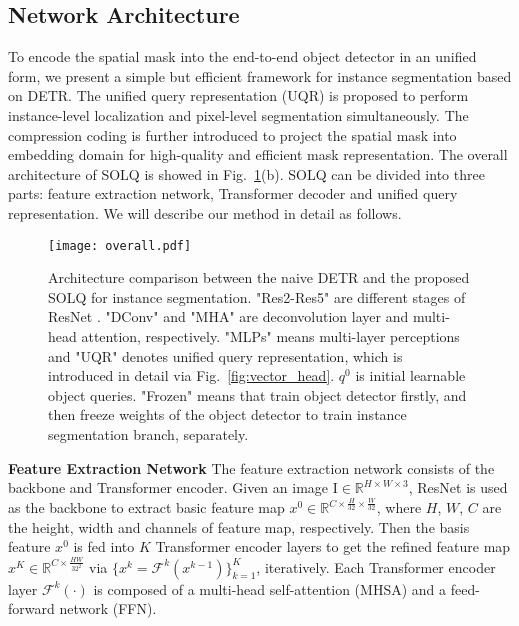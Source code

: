 \documentclass{article}
\begin{document}
\subsection{Network Architecture}
To encode the spatial mask into the end-to-end object detector in an unified form, we present a simple but efficient framework for instance segmentation based on DETR. The unified query representation (UQR) is proposed to perform instance-level localization and pixel-level segmentation simultaneously. The compression coding is further introduced to project the spatial mask into embedding domain for high-quality and efficient mask representation. 
The overall architecture of SOLQ is showed in Fig.~\ref{fig:architecture}(b). SOLQ can be divided into three parts: feature extraction network, Transformer decoder and unified query representation. We will describe our method in detail as follows.

\begin{figure}[h]
\centering
\texttt{[image: overall.pdf]}
\caption{Architecture comparison between the naive DETR and the proposed SOLQ for instance segmentation. "Res2-Res5" are different stages of ResNet \cite{he2016resnet}. "DConv" and "MHA" are deconvolution \cite{zeiler2010deconvolutional} layer and multi-head attention, respectively. "MLPs" means multi-layer perceptions and "UQR" denotes unified query representation, which is introduced in detail via Fig.~\ref{fig:vector_head}. $q^{0}$ is initial learnable object queries. "Frozen" means that train object detector firstly, and then freeze weights of the object detector to train instance segmentation branch, separately.}
\label{fig:architecture}
\end{figure}

\textbf{Feature Extraction Network}
The feature extraction network consists of the backbone and Transformer encoder. Given an image $\mathrm{I} \in\mathbb{R}^{H \times W \times 3}$, ResNet \cite{he2016resnet} is used as the backbone to extract basic feature map $x^{0}\in\mathbb{R}^{C \times \frac{H}{32} \times \frac{W}{32}}$, where $H$, $W$, $C$ are the height, width and channels of feature map, respectively. Then the basis feature $x^{0}$ is fed into $K$ Transformer encoder layers to get the refined feature map $x^{K}\in\mathbb{R}^{C \times \frac{HW}{32^{2}}}$ via $\{x^{k}=\mathcal{F}^{k}(x^{k-1})\}^{K}_{k=1}$, iteratively. Each Transformer encoder layer $\mathcal{F}^{k}(\cdot)$ is composed of a multi-head self-attention (MHSA) and a feed-forward network (FFN).
\end{document}
